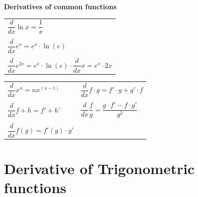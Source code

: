 \documentclass{article}
\begin{document}
\begin{center}
\pagebreak

\text{}

\vspace{0.7cm}


\textbf{Derivatives of common functions}


\begin{minipage}{0.4\textwidth}
  \begin{tabular}{l}
$\dfrac{d}{dx} \ln x = \dfrac{1}{x}$\\
\\
$\dfrac{d}{dx} e^x = e^x \cdot \ln(e)$\\
\\
$\dfrac{d}{dx} e^{2x} = e^x \cdot \ln(e) \cdot \dfrac{d}{dx} x = e^x \cdot 2x$
\end{tabular}
\end{minipage}
\begin{minipage}{0.5\textwidth}
\begin{tabular}{ll}
$\dfrac{d}{dx} x^n = nx^{(n-1)}$ & $\dfrac{d}{dx} f \cdot g = f'\cdot g + g' \cdot f$\\
\\
$\dfrac{d}{dx} f + h = f' + h'$ & $\dfrac{d}{dx} \dfrac{f}{g} = \dfrac{g\cdot f' - f \cdot g'}{g^2}$\\
\\
$\dfrac{d}{dx} f(g) = f'(g) \cdot g'$
\end{tabular}
\end{minipage}


\end{center}

\section{Derivative of Trigonometric functions}
\end{document}
